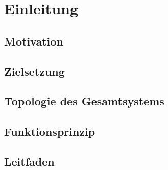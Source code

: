 \chapter{Einleitung}

\section{Motivation}

\section{Zielsetzung}

\section{Topologie des Gesamtsystems}

\section{Funktionsprinzip}

\section{Leitfaden}